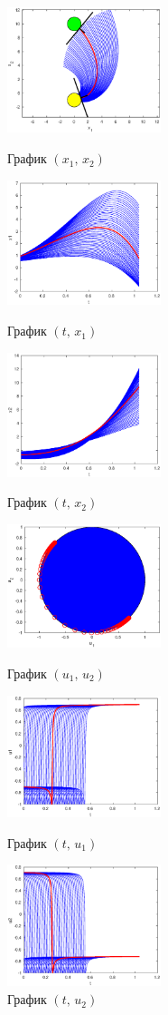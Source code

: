 \documentclass[11pt]{article}
\begin{document}
\begin{figure}[h]
\begin{multicols}{3}
	\hfill
	\includegraphics[width=45mm]{2xx.eps}
	\hfill
	\caption{График $(x_1, \, x_2)$}
	\hfill
	\includegraphics[width=45mm]{2tx1.eps}
	\hfill
	\caption{График $(t, \, x_1)$}
    \hfill
	\includegraphics[width=45mm]{2tx2.eps}
	\hfill
	\caption{График $(t, \, x_2)$}
\end{multicols}

\begin{multicols}{3}
	\hfill
	\includegraphics[width=45mm]{2uu.eps}
	\hfill
	\caption{График $(u_1, \, u_2)$}
	\hfill
	\includegraphics[width=45mm]{2tu1.eps}
	\hfill
	\caption{График $(t, \, u_1)$}
    \hfill
	\includegraphics[width=45mm]{2tu2.eps}
	\hfill
	\caption{График $(t, \, u_2)$}
\end{multicols}


\end{figure}
\end{document}

